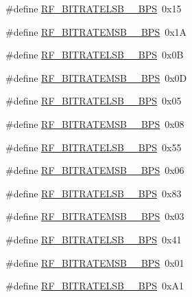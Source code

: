 \begin{DoxyCompactItemize}
\item 
\#define \mbox{\hyperlink{sx1276_regs-_fsk_8h_a9341847d10e8210454bc8c5abcbef3e3}{R\+F\+\_\+\+B\+I\+T\+R\+A\+T\+E\+L\+S\+B\+\_\+\_\+\+B\+PS}}~0x15
\item 
\#define \mbox{\hyperlink{sx1276_regs-_fsk_8h_a3fbe8a73f4b0a021159cd8046e9e1959}{R\+F\+\_\+\+B\+I\+T\+R\+A\+T\+E\+M\+S\+B\+\_\+\_\+\+B\+PS}}~0x1A
\item 
\#define \mbox{\hyperlink{sx1276_regs-_fsk_8h_a37dfb650a26879afa9a8aa036507b189}{R\+F\+\_\+\+B\+I\+T\+R\+A\+T\+E\+L\+S\+B\+\_\+\_\+\+B\+PS}}~0x0B
\item 
\#define \mbox{\hyperlink{sx1276_regs-_fsk_8h_ae69250b1621744d9da30c06f56d0f483}{R\+F\+\_\+\+B\+I\+T\+R\+A\+T\+E\+M\+S\+B\+\_\+\_\+\+B\+PS}}~0x0D
\item 
\#define \mbox{\hyperlink{sx1276_regs-_fsk_8h_ad137bc838a75f376cf1b9be4f53e6eb7}{R\+F\+\_\+\+B\+I\+T\+R\+A\+T\+E\+L\+S\+B\+\_\+\_\+\+B\+PS}}~0x05
\item 
\#define \mbox{\hyperlink{sx1276_regs-_fsk_8h_a1e8f56770ecc5d5f7264a7029f7ae2c3}{R\+F\+\_\+\+B\+I\+T\+R\+A\+T\+E\+M\+S\+B\+\_\+\_\+\+B\+PS}}~0x08
\item 
\#define \mbox{\hyperlink{sx1276_regs-_fsk_8h_a60340fe3a748b8e02ed6ebbf2426d620}{R\+F\+\_\+\+B\+I\+T\+R\+A\+T\+E\+L\+S\+B\+\_\+\_\+\+B\+PS}}~0x55
\item 
\#define \mbox{\hyperlink{sx1276_regs-_fsk_8h_aeec19a1a2418cf8ed29ac2ce61ebbe76}{R\+F\+\_\+\+B\+I\+T\+R\+A\+T\+E\+M\+S\+B\+\_\+\_\+\+B\+PS}}~0x06
\item 
\#define \mbox{\hyperlink{sx1276_regs-_fsk_8h_a4f1ddd00d5777887dc4b68b3711df3c9}{R\+F\+\_\+\+B\+I\+T\+R\+A\+T\+E\+L\+S\+B\+\_\+\_\+\+B\+PS}}~0x83
\item 
\#define \mbox{\hyperlink{sx1276_regs-_fsk_8h_a041c9eb73ab4c25e3ed8a25303a49ad0}{R\+F\+\_\+\+B\+I\+T\+R\+A\+T\+E\+M\+S\+B\+\_\+\_\+\+B\+PS}}~0x03
\item 
\#define \mbox{\hyperlink{sx1276_regs-_fsk_8h_a71ea2cd6143ebf9bf63a7118064a471f}{R\+F\+\_\+\+B\+I\+T\+R\+A\+T\+E\+L\+S\+B\+\_\+\_\+\+B\+PS}}~0x41
\item 
\#define \mbox{\hyperlink{sx1276_regs-_fsk_8h_a8e3881281736c31ce8b72b51e801b49d}{R\+F\+\_\+\+B\+I\+T\+R\+A\+T\+E\+M\+S\+B\+\_\+\_\+\+B\+PS}}~0x01
\item 
\#define \mbox{\hyperlink{sx1276_regs-_fsk_8h_ae22ca1c6a214c62d298eb1f6d76ba092}{R\+F\+\_\+\+B\+I\+T\+R\+A\+T\+E\+L\+S\+B\+\_\+\_\+\+B\+PS}}~0x\+A1
\item 

\end{DoxyCompactItemize}

